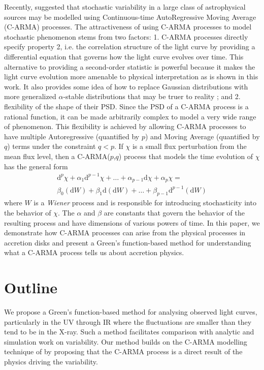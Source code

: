 \documentclass[a4paper,fleqn,usenatbib]{mnras}
\begin{document}
Recently, \citet{Kelly14} suggested that stochastic variability in a large class of astrophysical sources may be modelled using Continuous-time AutoRegressive Moving Average (C-ARMA) processes. The attractiveness of using C-ARMA processes to model stochastic phenomenon stems from two factors: 1. C-ARMA processes directly specify property 2, i.e. the correlation structure of the light curve by providing a differential equation that governs how the light curve evolves over time. This alternative to providing a second-order statistic is powerful because it makes the light curve evolution more amenable to physical interpretation as is shown in this work. It also provides some idea of how to replace Gaussian distributions with more generalized $\alpha$-stable distributions that may be truer to reality \citep{BrockwellMarquardt05, BrockwellLinder09}; and 2. flexibility of the shape of their PSD. Since the PSD of a C-ARMA process is a rational function, it can be made arbitrarily complex to model a very wide range of phenomenon. This flexibility is achieved by allowing C-ARMA processes to have multiple Autoregressive (quantified by $p$) and Moving Average (quantified by $q$) terms under the constraint $q < p$. If $\chi$ is a small flux perturbation from the mean flux level, then a C-ARMA($p$,$q$) process that models the time evolution of $\chi$ has the general form
\begin{multline}\label{eq:CARMAIntro}
\mathrm{d}^{p}\chi + \alpha_{1} \mathrm{d}^{p-1}\chi + \ldots + \alpha_{p-1} \mathrm{d}\chi + \alpha_{p} \chi = \\ \beta_{0} (\mathrm{d}W) + \beta_{1} \mathrm{d}(\mathrm{d}W) + \ldots + \beta_{p-1} \mathrm{d}^{p-1}(\mathrm{d}W)
\end{multline}
where $W$ is a \textit{Wiener} process and is responsible for introducing stochasticity into the behavior of $\chi$. The $\alpha$ and $\beta$ are constants that govern the behavior of the resulting process and have dimensions of various powers of time. In this paper, we demonstrate how C-ARMA processes can arise from the physical processes in accretion disks and present a Green's function-based method for understanding what a C-ARMA process tells us about accretion physics.

\section[Outline]{Outline}\label{sec:Outline}

We propose a Green's function-based method for analysing observed light curves, particularly in the UV through IR where the fluctuations are smaller than they tend to be in the X-ray. Such a method facilitates comparison with analytic and simulation work on variability. Our method builds on the C-ARMA modelling technique of \citet{Kelly14} by proposing that the C-ARMA process is a direct result of the physics driving the variability. 
\end{document}
